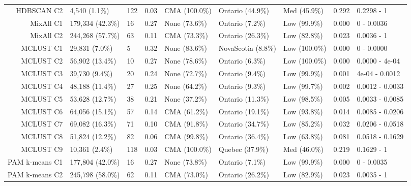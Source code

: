 \documentclass[11pt, a4paper]{article}
\begin{document}
\begin{table}[H]
{\begin{tabular}{|r|llllllll|}
\rowcolor{gray!25}  HDBSCAN C2 & 4,540 (1.1\%) & 122 & 0.03 & CMA (100.0\%) & Ontario (44.9\%) & Med (45.9\%) & 0.292 & 0.2298 - 1 \\
  MixAll C1 & 179,334 (42.3\%) & 16 & 0.27 & None (73.6\%) & Ontario (7.2\%) & Low (99.9\%) & 0.000 & 0 - 0.0036 \\
  MixAll C2 & 244,268 (57.7\%) & 63 & 0.11 & CMA (73.3\%) & Ontario (26.3\%) & Low (82.8\%) & 0.023 & 0.0036 - 1 \\
\rowcolor{gray!25}  MCLUST C1 & 29,831 (7.0\%) & 5 & 0.32 & None (83.6\%) & NovaScotia (8.8\%) & Low (100.0\%) & 0.000 & 0 - 0.0000 \\
\rowcolor{gray!25}  MCLUST C2 & 56,902 (13.4\%) & 10 & 0.27 & None (78.6\%) & Ontario (6.3\%) & Low (100.0\%) & 0.000 & 0.0000 - 4e-04 \\
 \rowcolor{gray!25} MCLUST C3 & 39,730 (9.4\%) & 20 & 0.24 & None (72.7\%) & Ontario (9.4\%) & Low (99.9\%) & 0.001 & 4e-04 - 0.0012 \\
 \rowcolor{gray!25} MCLUST C4 & 48,188 (11.4\%) & 27 & 0.25 & None (64.2\%) & Ontario (9.3\%) & Low (99.7\%) & 0.002 & 0.0012 - 0.0033 \\
 \rowcolor{gray!25} MCLUST C5 & 53,628 (12.7\%) & 38 & 0.21 & None (37.2\%) & Ontario (11.3\%) & Low (98.5\%) & 0.005 & 0.0033 - 0.0085 \\
\rowcolor{gray!25}  MCLUST C6 & 64,056 (15.1\%) & 57 & 0.14 & CMA (61.2\%) & Ontario (19.1\%) & Low (93.8\%) & 0.014 & 0.0085 - 0.0206 \\
 \rowcolor{gray!25} MCLUST C7 & 69,082 (16.3\%) & 71 & 0.10 & CMA (91.8\%) & Ontario (34.7\%) & Low (85.2\%) & 0.032 & 0.0206 - 0.0518 \\
\rowcolor{gray!25}  MCLUST C8 & 51,824 (12.2\%) & 82 & 0.06 & CMA (99.8\%) & Ontario (36.4\%) & Low (63.8\%) & 0.081 & 0.0518 - 0.1629 \\
 \rowcolor{gray!25} MCLUST C9 & 10,361 (2.4\%) & 118 & 0.03 & CMA (100.0\%) & Quebec (37.9\%) & Med (46.0\%) & 0.219 & 0.1629 - 1 \\
  PAM k-means C1 & 177,804 (42.0\%) & 16 & 0.27 & None (73.8\%) & Ontario (7.1\%) & Low (99.9\%) & 0.000 & 0 - 0.0035 \\
  PAM k-means C2 & 245,798 (58.0\%) & 62 & 0.11 & CMA (73.0\%) & Ontario (26.2\%) & Low (82.9\%) & 0.023 & 0.0035 - 1 \\
   \hline
\end{tabular}
}
\end{table}
\end{document}
